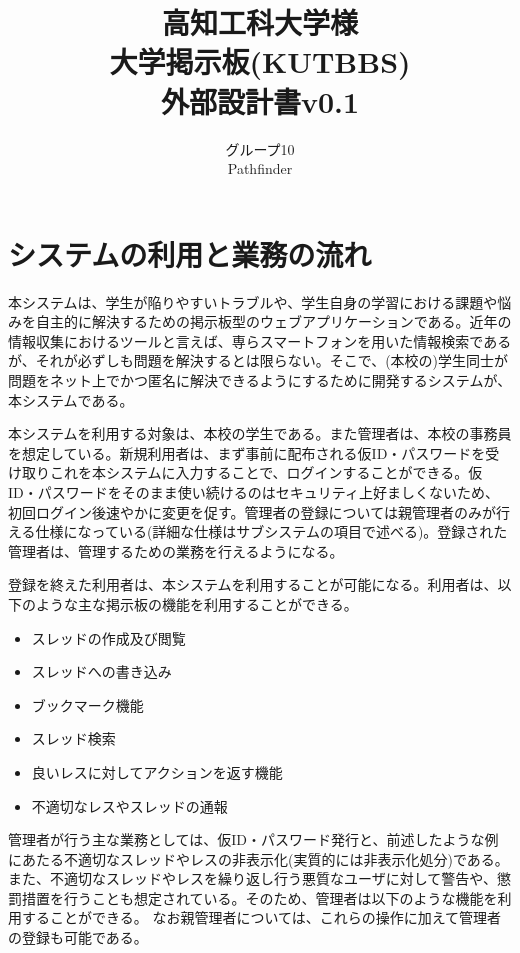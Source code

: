 \documentclass[a4j]{jarticle}
\title{
\vspace{30mm}
{\bf 高知工科大学様}
\\
\vspace{5mm}
大学掲示板(KUTBBS)\\
\vspace{5mm}
{\bf  外部設計書v0.1}
\vspace{90mm}
}
\author{
\vspace{5mm}
グループ10 \\
\vspace{5mm}
Pathfinder \\
\vspace{5mm}
\vspace{10mm}
}
\begin{document}
\maketitle
\tableofcontents
\newpage




\section{システムの利用と業務の流れ}
本システムは、学生が陥りやすいトラブルや、学生自身の学習における課題や悩みを自主的に解決するための掲示板型のウェブアプリケーションである。近年の情報収集におけるツールと言えば、専らスマートフォンを用いた情報検索であるが、それが必ずしも問題を解決するとは限らない。そこで、(本校の)学生同士が問題をネット上でかつ匿名に解決できるようにするために開発するシステムが、本システムである。



本システムを利用する対象は、本校の学生である。また管理者は、本校の事務員を想定している。新規利用者は、まず事前に配布される仮ID・パスワードを受け取りこれを本システムに入力することで、ログインすることができる。仮ID・パスワードをそのまま使い続けるのはセキュリティ上好ましくないため、初回ログイン後速やかに変更を促す。管理者の登録については親管理者のみが行える仕様になっている(詳細な仕様はサブシステムの項目で述べる)。登録された管理者は、管理するための業務を行えるようになる。


登録を終えた利用者は、本システムを利用することが可能になる。利用者は、以下のような主な掲示板の機能を利用することができる。
\begin{itemize}
  \item スレッドの作成及び閲覧
  \item スレッドへの書き込み
  \item ブックマーク機能
  \item スレッド検索
  \item 良いレスに対してアクションを返す機能
  \item 不適切なレスやスレッドの通報
\end{itemize}



管理者が行う主な業務としては、仮ID・パスワード発行と、前述したような例にあたる不適切なスレッドやレスの非表示化(実質的には非表示化処分)である。また、不適切なスレッドやレスを繰り返し行う悪質なユーザに対して警告や、懲罰措置を行うことも想定されている。そのため、管理者は以下のような機能を利用することができる。
なお親管理者については、これらの操作に加えて管理者の登録も可能である。
\end{document}
